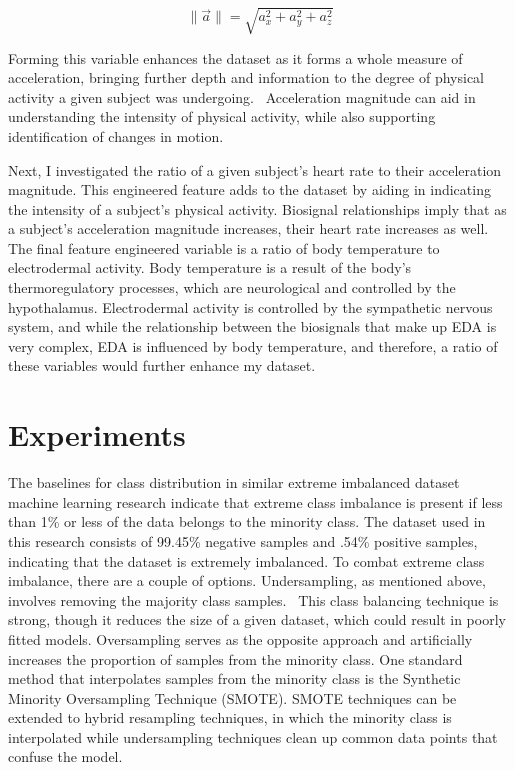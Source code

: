 \documentclass{article}
\begin{document}
\begin{equation}
    \|\vec{a}\| = \sqrt{a_x^2 + a_y^2 + a_z^2}
    \label{eq:vector_magnitude}
\end{equation}

Forming this variable enhances the dataset as it forms a whole measure of acceleration, bringing further depth and information to the degree of physical activity a given subject was undergoing.~\cite{Arif2014} Acceleration magnitude can aid in understanding the intensity of physical activity, while also supporting identification of changes in motion. 

Next, I investigated the ratio of a given subject’s heart rate to their acceleration magnitude. This engineered feature adds to the dataset by aiding in indicating the intensity of a subject’s physical activity. Biosignal relationships imply that as a subject’s acceleration magnitude increases, their heart rate increases as well. The final feature engineered variable is a ratio of body temperature to electrodermal activity. Body temperature is a result of the body’s thermoregulatory processes, which are neurological and controlled by the hypothalamus. Electrodermal activity is controlled by the sympathetic nervous system, and while the relationship between the biosignals that make up EDA is very complex, EDA is influenced by body temperature, and therefore, a ratio of these variables would further enhance my dataset. 

\section{Experiments}

The baselines for class distribution in similar extreme imbalanced dataset machine learning research indicate that extreme class imbalance is present if less than 1\% or less of the data belongs to the minority class. The dataset used in this research consists of 99.45\% negative samples and .54\% positive samples, indicating that the dataset is extremely imbalanced. To combat extreme class imbalance, there are a couple of options. Undersampling, as mentioned above, involves removing the majority class samples.~\cite{leborgne2022fraud} This class balancing technique is strong, though it reduces the size of a given dataset, which could result in poorly fitted models. Oversampling serves as the opposite approach and artificially increases the proportion of samples from the minority class. One standard method that interpolates samples from the minority class is the Synthetic Minority Oversampling Technique (SMOTE). SMOTE techniques can be extended to hybrid resampling techniques, in which the minority class is interpolated while undersampling techniques clean up common data points that confuse the model. 
\end{document}
